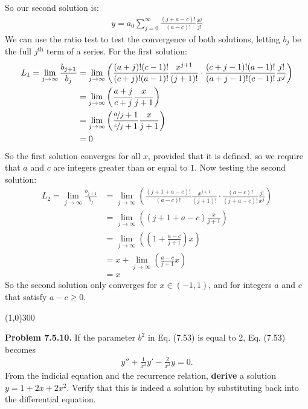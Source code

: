 \documentclass{article}
\begin{document}
So our second solution is:
\begin{equation*}
\begin{aligned}
	\boxed{y = a_0\sum_{j=0}^\infty \frac{(j+a-c)!}{(a-c)!} \frac{x^{j}}{j!}}
\end{aligned}
\end{equation*}
We can use the ratio test to test the convergence of both solutions, letting $b_j$ be the full $j^{\text{th}}$ term of a series. For the first solution:
\begin{equation*}
\begin{aligned}
	L_1 = \lim_{j\to\infty}\frac{b_{j+1}}{b_j} &= \lim_{j\to\infty}\left(\frac{(a+j)!(c-1)!}{(c+j)!(a-1)!} \frac{x^{j+1}}{(j+1)!} \cdot \frac{(c+j-1)!(a-1)!}{(a+j-1)!(c-1)!} \frac{j!}{x^{j}}\right) \\
	&= \lim_{j\to\infty}\left(\frac{a+j}{c+j}\frac{x}{j+1}\right) \\
	&= \lim_{j\to\infty}\left(\frac{\nicefrac{a}{j}+1}{\nicefrac{c}{j}+1}\frac{x}{j+1}\right) \\
	&= 0
\end{aligned}
\end{equation*}
So the first solution converges for all $x$, provided that it is defined, so we require that $a$ and $c$ are integers greater than or equal to $1$. Now testing the second solution:
\begin{equation*}
\begin{aligned}
	L_2 = \lim_{j\to\infty}\frac{b_{j+1}}{b_j} &= \lim_{j\to\infty}\left(\frac{(j+1+a-c)!}{(a-c)!} \frac{x^{j+1}}{(j+1)!} \cdot \frac{(a-c)!}{(j+a-c)!} \frac{j!}{x^{j}}\right) \\
	&= \lim_{j\to\infty}\left((j+1+a-c)\frac{x}{j+1}\right) \\
	&= \lim_{j\to\infty}\left(\left(1+\frac{a-c}{j+1}\right)x\right) \\
	&= x + \lim_{j\to\infty}\left(\frac{a-c}{j+1}x\right) \\
	&= x
\end{aligned}
\end{equation*}
So the second solution only converges for $x \in (-1,1)$, and for integers $a$ and $c$ that satisfy $a-c \geq 0$.

\begin{center}
\line(1,0){300}
\end{center}
\textbf{Problem 7.5.10.} If the parameter $b^2$ in Eq. (7.53) is equal to 2, Eq. (7.53) becomes
\begin{equation*}
\begin{aligned}
	y'' + \frac{1}{x^2}y'-\frac{2}{x^2}y = 0.
\end{aligned}
\end{equation*}
From the indicial equation and the recurrence relation, \textbf{derive} a solution $y = 1 + 2x + 2x^2$. Verify that this is indeed a solution by substituting back into the differential equation.
\end{document}
